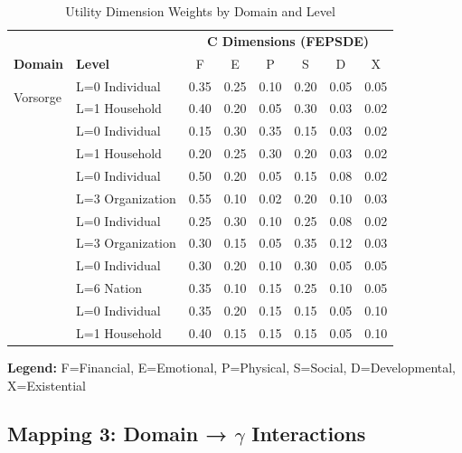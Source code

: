 \begin{table}[htbp]
\centering
\caption{Utility Dimension Weights by Domain and Level}
\label{tab:ggg-c-mapping}
\renewcommand{\arraystretch}{1.2}
\small
\begin{tabular}{@{}ll|cccccc@{}}
\toprule
& & \multicolumn{6}{c}{\textbf{C Dimensions (FEPSDE)}} \\
\textbf{Domain} & \textbf{Level} & F & E & P & S & D & X \\
\midrule
\multirow{2}{*}{Vorsorge}
& L=0 Individual & 0.35 & 0.25 & 0.10 & 0.20 & 0.05 & 0.05 \\
& L=1 Household & 0.40 & 0.20 & 0.05 & 0.30 & 0.03 & 0.02 \\
\addlinespace
\multirow{2}{*}{Gesundheit}
& L=0 Individual & 0.15 & 0.30 & 0.35 & 0.15 & 0.03 & 0.02 \\
& L=1 Household & 0.20 & 0.25 & 0.30 & 0.20 & 0.03 & 0.02 \\
\addlinespace
\multirow{2}{*}{Finance}
& L=0 Individual & 0.50 & 0.20 & 0.05 & 0.15 & 0.08 & 0.02 \\
& L=3 Organization & 0.55 & 0.10 & 0.02 & 0.20 & 0.10 & 0.03 \\
\addlinespace
\multirow{2}{*}{HR/Org}
& L=0 Individual & 0.25 & 0.30 & 0.10 & 0.25 & 0.08 & 0.02 \\
& L=3 Organization & 0.30 & 0.15 & 0.05 & 0.35 & 0.12 & 0.03 \\
\addlinespace
\multirow{2}{*}{Public}
& L=0 Individual & 0.30 & 0.20 & 0.10 & 0.30 & 0.05 & 0.05 \\
& L=6 Nation & 0.35 & 0.10 & 0.15 & 0.25 & 0.10 & 0.05 \\
\addlinespace
\multirow{2}{*}{Energy}
& L=0 Individual & 0.35 & 0.20 & 0.15 & 0.15 & 0.05 & 0.10 \\
& L=1 Household & 0.40 & 0.15 & 0.15 & 0.15 & 0.05 & 0.10 \\
\bottomrule
\end{tabular}
\end{table}

\textbf{Legend:} F=Financial, E=Emotional, P=Physical, S=Social, D=Developmental, X=Existential

\subsection{Mapping 3: Domain → $\gamma$ Interactions}

